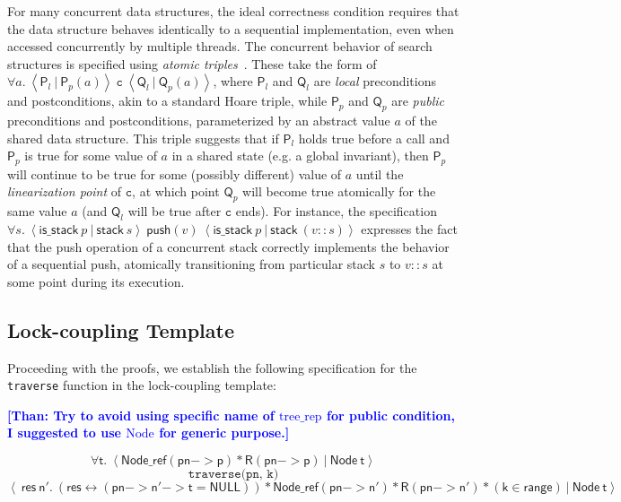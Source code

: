 \documentclass[a4paper,UKenglish,cleveref, autoref, thm-restate]{lipics-v2021}
\newcommand{\treerep}{\ensuremath{\mathsf{Node}}}
\newcommand{\nodeboxrep}{\ensuremath{\mathsf{Node\_ref}}}
\newcommand{\lockinv}{\ensuremath{\mathsf{lock\_inv}}}
\newcommand{\than}[1]{\textbf{\textcolor{blue}{[Than: #1]}}}
\begin{document}
For many concurrent data structures, the ideal correctness condition requires that the data structure behaves identically to a sequential implementation, even when accessed concurrently by multiple threads. The concurrent behavior of search structures is specified using \emph{atomic triples}~\cite{tada}. These take the form of $\forall a.\ \left\langle \mathsf{P}_l\ |\ \mathsf{P}_p(a) \right\rangle\ \texttt{c}\ \left\langle \mathsf{Q}_l\ |\ \mathsf{Q}_p(a)\right\rangle$, where $\mathsf{P}_l$ and $\mathsf{Q}_l$ are \emph{local} preconditions and postconditions, akin to a standard Hoare triple, while $\mathsf{P}_p$ and $\mathsf{Q}_p$ are \emph{public} preconditions and postconditions, parameterized by an abstract value $a$ of the shared data structure. This triple suggests that if $\mathsf{P}_l$ holds true before a call and $\mathsf{P}_p$ is true for some value of $a$ in a shared state (e.g. a global invariant), then $\mathsf{P}_p$ will continue to be true for some (possibly different) value of $a$ until the \emph{linearization point} of $\texttt{c}$, at which point $\mathsf{Q}_p$ will become true atomically for the same value $a$ (and $\mathsf{Q}_l$ will be true after $\texttt{c}$ ends). For instance, the specification
$\forall s.\ \left\langle \mathsf{is\_stack}\ p\ |\ \mathsf{stack}\ s\right\rangle\ \mathsf{push}(v)\ \left\langle \mathsf{is\_stack}\ p\ |\ \mathsf{stack}\ (v::s)\right\rangle$
expresses the fact that the push operation of a concurrent stack correctly implements the behavior of a sequential push, atomically transitioning from particular stack $s$ to $v::s$ at some point during its execution.

\subsection{Lock-coupling Template}
Proceeding with the proofs, we establish the following specification for the \lstinline{traverse} function in the lock-coupling template:

\than{Try to avoid using specific name of $\mathrm{tree\_rep}$ for public condition, I suggested to use $\mathrm{Node}$ for generic purpose.} 


$$\forall \mathsf{t}.\ \left\langle \nodeboxrep \mathsf{(pn->p)} 
\ast \mathsf{R(pn->p)} \ | \ \treerep\ \mathsf{t} \right\rangle $$
$$\texttt{traverse(pn, k)}$$
$$\left\langle \ \mathsf{res} \ \mathsf{n'}. \ (\mathsf{res} \leftrightarrow (\mathsf{pn->n'->t} = \mathsf{NULL})) \ast \nodeboxrep \mathsf{(pn->n')}
\ast \mathsf{R(pn->n')} \ast (\mathsf{k} \in \mathsf{range})
\   |\ \treerep\ \mathsf{t} \right\rangle$$
\end{document}
